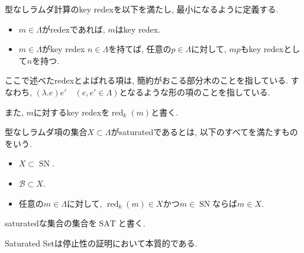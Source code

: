 \documentclass[12pt, titlepage]{ltjsarticle}
\DeclareMathOperator{\SN}{SN}
\DeclareMathOperator{\SAT}{SAT}
\DeclareMathOperator{\red}{red}
\begin{document}
\begin{defn}
 型なしラムダ計算のkey redexを以下を満たし, 最小になるように定義する.
 \begin{itemize}
  \item $m \in \Lambda$がredexであれば, $m$はkey redex.
  \item $m \in \Lambda$がkey redex $n \in \Lambda$を持てば, 任意の$p \in \Lambda$に対して, $m p$もkey redexとして$n$を持つ.
 \end{itemize}
ここで述べたredexとよばれる項は, 簡約がおこる部分木のことを指している. すなわち, $(\lambda. e) e' \quad (e, e' \in \Lambda)$となるような形の項のことを指している.
 
また, $m$に対するkey redexを$\red_k(m)$と書く.
\end{defn}

\begin{defn}\label{ss}
 型なしラムダ項の集合$X \subset \Lambda$がsaturatedであるとは, 以下のすべてを満たすものをいう.
 \begin{itemize}
  \item $X \subset \SN$.
  \item $\mathcal{B} \subset X$.
  \item 任意の$m \in \Lambda$に対して, $\red_k(m) \in X$かつ$m \in \SN$ならば$m \in X$.
 \end{itemize}
 saturatedな集合の集合を$\SAT$と書く.
\end{defn}

\begin{rem}
 Saturated Setは停止性の証明において本質的である.
\end{rem}
\end{document}
